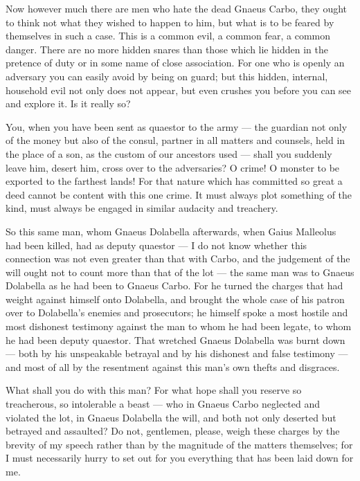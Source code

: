 Now however much there are men who hate the dead Gnaeus Carbo, they ought to think not what they wished to happen to him, but what is to be feared by themselves in such a case. This is a common evil, a common fear, a common danger. There are no more hidden snares than those which lie hidden in the pretence of duty or in some name of close association. For one who is openly an adversary you can easily avoid by being on guard; but this hidden, internal, household evil not only does not appear, but even crushes you before you can see and explore it. Is it really so?

 You, when you have been sent as quaestor to the army --- the guardian not only of the money but also of the consul, partner in all matters and counsels, held in the place of a son, as the custom of our ancestors used --- shall you suddenly leave him, desert him, cross over to the adversaries? O crime! O monster to be exported to the farthest lands! For that nature which has committed so great a deed cannot be content with this one crime. It must always plot something of the kind, must always be engaged in similar audacity and treachery.

 So this same man, whom Gnaeus Dolabella afterwards, when Gaius Malleolus had been killed, had as deputy quaestor --- I do not know whether this connection was not even greater than that with Carbo, and the judgement of the will ought not to count more than that of the lot --- the same man was to Gnaeus Dolabella as he had been to Gnaeus Carbo. For he turned the charges that had weight against himself onto Dolabella, and brought the whole case of his patron over to Dolabella's enemies and prosecutors; he himself spoke a most hostile and most dishonest testimony against the man to whom he had been legate, to whom he had been deputy quaestor. That wretched Gnaeus Dolabella was burnt down --- both by his unspeakable betrayal and by his dishonest and false testimony --- and most of all by the resentment against this man's own thefts and disgraces.

 What shall you do with this man? For what hope shall you reserve so treacherous, so intolerable a beast --- who in Gnaeus Carbo neglected and violated the lot, in Gnaeus Dolabella the will, and both not only deserted but betrayed and assaulted? Do not, gentlemen, please, weigh these charges by the brevity of my speech rather than by the magnitude of the matters themselves; for I must necessarily hurry to set out for you everything that has been laid down for me.


